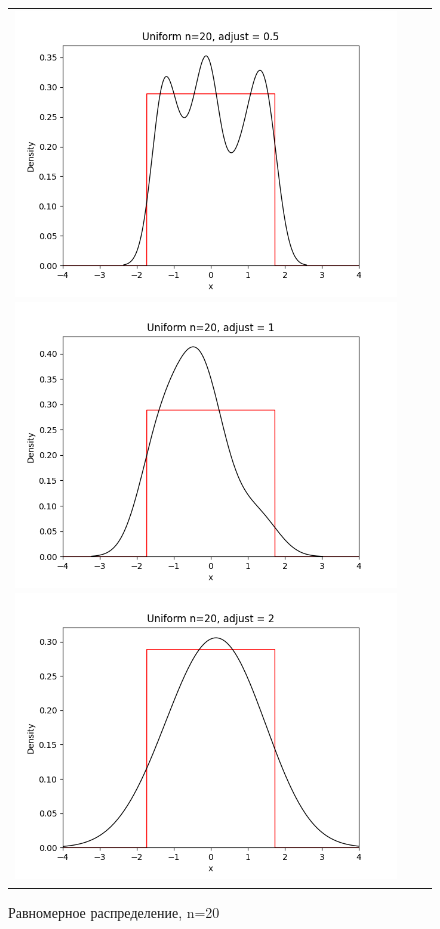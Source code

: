 \begin{figure}[H]
	\begin{tabular}{ccc}
		\includegraphics[scale=0.33]{uniform_n20_adjust0.5.png}
		\includegraphics[scale=0.33]{uniform_n20_adjust1.png}
		\includegraphics[scale=0.33]{uniform_n20_adjust2.png}
	\end{tabular}
	\caption{Равномерное распределение, n=20}
\end{figure}

